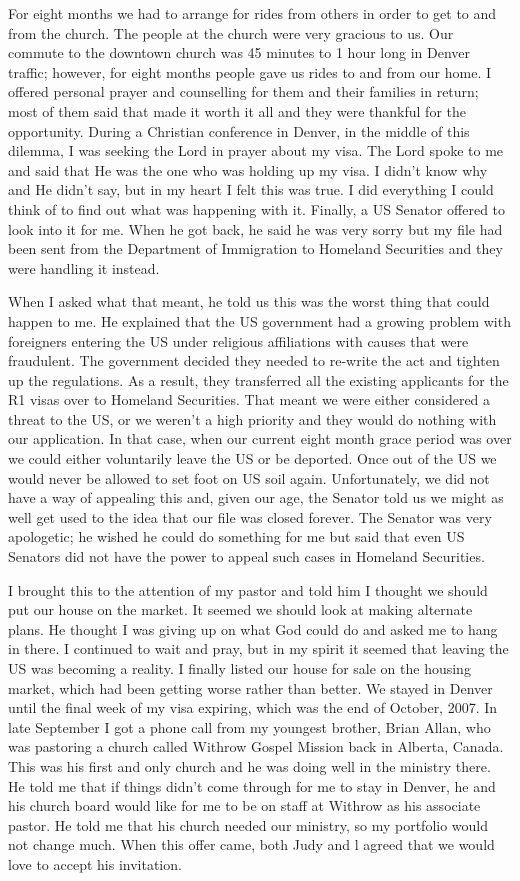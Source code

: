 \documentclass[oneside]{book}
\begin{document}
For eight months we had to arrange for rides from others in order to get to and from the church.  The people at the church were very gracious to us. Our commute to the downtown church was 45 minutes to 1 hour long in Denver traffic; however, for eight months people gave us rides to and from our home. I offered personal prayer and counselling for them and their families in return; most of them said that made it worth it all and they were thankful for the opportunity. During a Christian conference in Denver, in the middle of this dilemma, I was seeking the Lord in prayer about my visa. The Lord spoke to me and said that He was the one who was holding up my visa. I didn’t know why and He didn’t say, but in my heart I felt this was true. I did everything I could think of to find out what was happening with it. Finally, a US Senator offered to look into it for me. When he got back, he said he was very sorry but my file had been sent from the Department of Immigration to Homeland Securities and they were handling it instead.
 
When I asked what that meant, he told us this was the worst thing that could happen to me. He explained that the US government had a growing problem with foreigners entering the US under religious affiliations with causes that were fraudulent. The government decided they needed to re-write the act and tighten up the regulations. As a result, they transferred all the existing applicants for the R1 visas over to Homeland Securities. That meant we were either considered  a threat to the US, or we weren’t a high priority and they would do nothing with our application. In that case, when our current eight month grace period was over we could either voluntarily leave the US or be deported. Once out of the US we would never be allowed to set foot on US soil again. Unfortunately, we did not have a way of appealing this and, given our age, the Senator told us we might as well get used to the idea that our file was closed forever. The Senator was very apologetic; he wished he could do something for me but said that even US Senators did not have the power to appeal such cases in Homeland Securities.

I brought this to the attention of my pastor and told him I thought we should put our house on the market. It seemed we should look at making alternate plans. He thought I was giving up on what God could do and asked me to hang in there. I continued to wait and pray, but in my spirit it seemed that leaving the US was becoming a reality. I finally listed our house for sale on the housing market, which had been getting worse rather than better. We stayed in Denver until the final week of my visa expiring, which was the end of October, 2007. In late September I got a phone call from my youngest brother, Brian Allan, who was pastoring a church called Withrow Gospel Mission back in Alberta, Canada. This was his first and only church and he was doing well in the ministry there. He told me that if things didn’t come through for me to stay in Denver, he and his church board would like for me to be on staff at Withrow as his associate pastor. He told me that his church needed our ministry, so my portfolio would not change much. When this offer came, both Judy and l agreed that we would love to accept his invitation.
\end{document}
